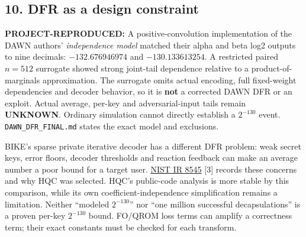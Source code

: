 \documentclass[
  10pt,
  a4paper,
]{article}
\begin{document}
\hypertarget{dfr-as-a-design-constraint}{%
\subsection{10. DFR as a design
constraint}\label{dfr-as-a-design-constraint}}

\textbf{PROJECT-REPRODUCED:} A positive-convolution implementation of
the DAWN authors' \emph{independence model} matched their alpha and beta
log2 outputs to nine decimals: \(-132.676946974\) and
\(-130.133613254\). A restricted paired \(n=512\) surrogate showed
strong joint-tail dependence relative to a product-of-marginals
approximation. The surrogate omits actual encoding, full fixed-weight
dependencies and decoder behavior, so it is \textbf{not} a corrected
DAWN DFR or an exploit. Actual average, per-key and adversarial-input
tails remain \textbf{UNKNOWN}. Ordinary simulation cannot directly
establish a \(2^{-130}\) event. \texttt{DAWN\_DFR\_FINAL.md} states the
exact model and exclusions.

BIKE's sparse private iterative decoder has a different DFR problem:
weak secret keys, error floors, decoder thresholds and reaction feedback
can make an average number a poor bound for a target user.
\href{https://nvlpubs.nist.gov/nistpubs/ir/2025/NIST.IR.8545.pdf}{NIST
IR 8545} {[}3{]} records these concerns and why HQC was selected. HQC's
public-code analysis is more stable by this comparison, while its own
coefficient-independence simplification remains a limitation. Neither
``modeled \(2^{-130}\)'' nor ``one million successful decapsulations''
is a proven per-key \(2^{-130}\) bound. FO/QROM loss terms can amplify a
correctness term; their exact constants must be checked for each
transform.
\end{document}
